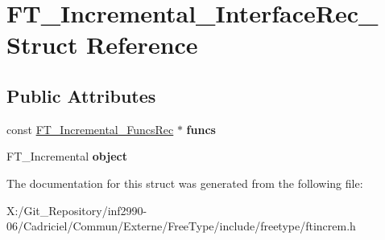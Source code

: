\hypertarget{struct_f_t___incremental___interface_rec__}{\section{F\-T\-\_\-\-Incremental\-\_\-\-Interface\-Rec\-\_\- Struct Reference}
\label{struct_f_t___incremental___interface_rec__}
}
\subsection*{Public Attributes}
\begin{DoxyCompactItemize}
\item 
\hypertarget{struct_f_t___incremental___interface_rec___acd254ae2bdd80b4c9218a484c6bc2a41}{const \hyperlink{struct_f_t___incremental___funcs_rec__}{F\-T\-\_\-\-Incremental\-\_\-\-Funcs\-Rec} $\ast$ {\bfseries funcs}}\label{struct_f_t___incremental___interface_rec___acd254ae2bdd80b4c9218a484c6bc2a41}

\item 
\hypertarget{struct_f_t___incremental___interface_rec___ae4f527f53465ff84ad01b484fe721a88}{F\-T\-\_\-\-Incremental {\bfseries object}}\label{struct_f_t___incremental___interface_rec___ae4f527f53465ff84ad01b484fe721a88}

\end{DoxyCompactItemize}


The documentation for this struct was generated from the following file\-:\begin{DoxyCompactItemize}
\item 
X\-:/\-Git\-\_\-\-Repository/inf2990-\/06/\-Cadriciel/\-Commun/\-Externe/\-Free\-Type/include/freetype/ftincrem.\-h\end{DoxyCompactItemize}
